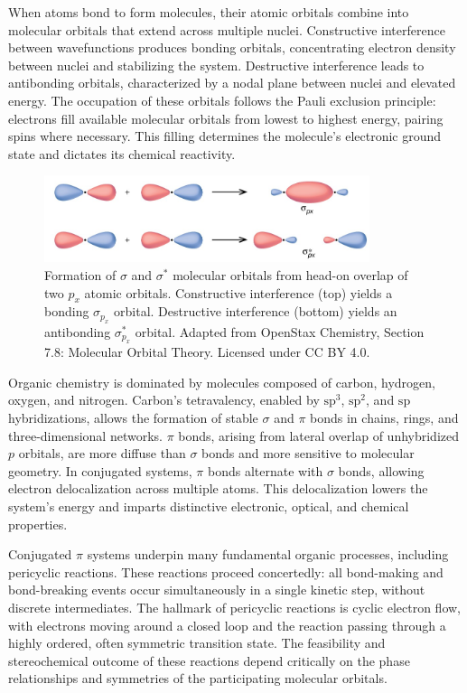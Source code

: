 When atoms bond to form molecules, their atomic orbitals combine into molecular orbitals that extend across multiple nuclei. Constructive interference between wavefunctions produces bonding orbitals, concentrating electron density between nuclei and stabilizing the system. Destructive interference leads to antibonding orbitals, characterized by a nodal plane between nuclei and elevated energy. The occupation of these orbitals follows the Pauli exclusion principle: electrons fill available molecular orbitals from lowest to highest energy, pairing spins where necessary. This filling determines the molecule’s electronic ground state and dictates its chemical reactivity.

\begin{figure}[H]
\centering
\includegraphics[width=0.85\textwidth]{46_WoodwardHoffmannRules/CNX_Chem_08_04_pMOsigma1.jpg}
\caption{Formation of $\sigma$ and $\sigma^*$ molecular orbitals from head-on overlap of two $p_x$ atomic orbitals. Constructive interference (top) yields a bonding $\sigma_{p_x}$ orbital. Destructive interference (bottom) yields an antibonding $\sigma_{p_x}^*$ orbital. Adapted from OpenStax Chemistry, Section 7.8: Molecular Orbital Theory. Licensed under CC BY 4.0.}
\label{fig:sigma_px}
\end{figure}

Organic chemistry is dominated by molecules composed of carbon, hydrogen, oxygen, and nitrogen. Carbon’s tetravalency, enabled by $\mathrm{sp}^3$, $\mathrm{sp}^2$, and $\mathrm{sp}$ hybridizations, allows the formation of stable $\sigma$ and $\pi$ bonds in chains, rings, and three-dimensional networks. $\pi$ bonds, arising from lateral overlap of unhybridized $p$ orbitals, are more diffuse than $\sigma$ bonds and more sensitive to molecular geometry. In conjugated systems, $\pi$ bonds alternate with $\sigma$ bonds, allowing electron delocalization across multiple atoms. This delocalization lowers the system's energy and imparts distinctive electronic, optical, and chemical properties.

Conjugated $\pi$ systems underpin many fundamental organic processes, including pericyclic reactions. These reactions proceed concertedly: all bond-making and bond-breaking events occur simultaneously in a single kinetic step, without discrete intermediates. The hallmark of pericyclic reactions is cyclic electron flow, with electrons moving around a closed loop and the reaction passing through a highly ordered, often symmetric transition state. The feasibility and stereochemical outcome of these reactions depend critically on the phase relationships and symmetries of the participating molecular orbitals.

